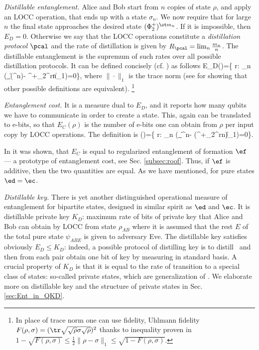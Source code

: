 \documentclass[twocolumn,aps,rmp]{revtex4}
\begin{document}
{\it Distillable entanglement.} Alice and Bob start from $n$ copies
of state $\rho$, and apply an LOCC operation, that ends up with a
state $\sigma_n$. We now require that for large $n$ the final state
approaches the desired state $(\Phi^+_2)^{\ot m_n}$. If it is
impossible, then $E_D=0$.  Otherwise we say that the LOCC operations
constitute a {\it distillation protocol} $\pcal$ and the rate of
distillation is given by $R_\pcal=\lim_n {m_n\over n}$. The
distillable entanglement is the supremum of such rates over all
possible distillation protocols. It can be defined concisely  (cf.
\cite{PlenioVirmani2006-review}) as follows \be
E_D(\rho)=\sup\left\{ r: \lim_{n\to \infty} \left(\inf_\Lambda \|
\Lambda(\rho^{\ot n})- \Phi^+_{2^{rn}}\|_1\right)=0\right\}, \ee
where $\|\cdot\|_1$ is the trace norm (see \cite{Rains1998-def} for
showing that other possible definitions are equivalent).
\footnote{In place of trace norm one can use fidelity,
Uhlmann fidelity $F(\rho,\sigma)=(\tr \sqrt{\sqrt \rho \sigma\sqrt
\rho})^2$ thanks to inequality proven in \cite{Fuchs-Graaf} $
1-\sqrt{F(\rho,\sigma)} \leq \frac{1}{2} \|\rho-\sigma\|_1 \leq
\sqrt{1-F(\rho,\sigma)}.
  \label{eq:fuchs}$
}


{\it Entanglement cost.} It is a measure dual to $E_D$, and it
reports how many qubits we have to communicate in order to create a
state. This, again can be translated to e-bits, so that $E_C(\rho)$
is the number of e-bits one can obtain from $\rho$ per input copy by
LOCC operations. The definition is
\be \ec(\rho)=\inf\left\{ r:
\lim_{n\to \infty} \left(\inf_\Lambda \| \rho^{\ot n}-
\Lambda(\Phi^+_{2^{rn}})\|_1\right)=0\right\}.
\ee

In \cite{cost} it was shown, that $E_C$ is equal to regularized entanglement of formation
$\ef$ --- a prototype of entanglement cost, see Sec. \ref{subsec:roof}.
Thus, if $\ef$ is additive, then the two quantities are equal.
As we have mentioned, for pure states $\ed=\ec$.

{\it Distillable key.}
There is yet another distinguished operational measure
of entanglement for bipartite states, designed in similar spirit as $\ed$ and $\ec$.
It is distillable private key $K_D$: maximum rate of bits
of private key that Alice and Bob can obtain by LOCC from state $\rho_{AB}$
where it is assumed that the rest $E$ of the total pure state $\psi_{ABE}$
is given to adversary Eve.  The distillable key satisfies obviously
$E_D\leq K_D$: indeed, a possible protocol of distilling key
is to distill \eprstates\ and then from each pair obtain one bit of
key by measuring in standard basis. A crucial property of $K_D$
is that it is equal to the rate of transition to a special class of states:
so-called private states, which are generalization of \eprstates.
We elaborate more on distillable key and the structure of private states in Sec.
\ref{sec:Ent_in_QKD}.
\end{document}
